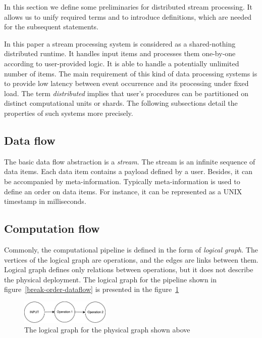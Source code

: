 

\label {fs-stream}

In this section we define some preliminaries for distributed stream processing. It allows us to unify required terms and to introduce definitions, which are needed for the subsequent statements.

In this paper a stream processing system is considered as a shared-nothing distributed runtime. It handles input items and processes them one-by-one according to user-provided logic. It is able to handle a potentially unlimited number of items. The main requirement of this kind of data processing systems is to provide low latency between event occurrence and its processing under fixed load. The term {\em distributed} implies that user's procedures can be partitioned on distinct computational units or shards. The following subsections detail the properties of such systems more precisely.  

\subsection{Data flow}
The basic data flow abstraction is a {\it stream}. The stream is an infinite sequence of data items. Each data item contains a payload defined by a user. Besides, it can be accompanied by meta-information. Typically meta-information is used to define an order on data items. For instance, it can be represented as a UNIX timestamp in milliseconds.


\subsection{Computation flow}
Commonly, the computational pipeline is defined in the form of {\it logical graph}. The vertices of the logical graph are operations, and the edges are links between them. Logical graph defines only relations between operations, but it does not describe the physical deployment. The logical graph for the pipeline shown in figure~\ref{break-order-dataflow} is presented in the figure~\ref{break-order-dataflow-logical}

\begin{figure}[htbp]
  \centering
  \includegraphics[width=0.38\textwidth]{pics/break_order_pipeline_logical}
  \caption{The logical graph for the physical graph shown above} 
  \label {break-order-dataflow-logical}
\end{figure}

